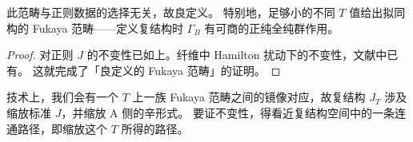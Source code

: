 
\begin{corollary}\label{c8:cor-well-defined}
此范畴与正则数据的选择无关，故良定义。
特别地，足够小的不同 $T$ 值给出拟同构的 Fukaya 范畴——定义复结构时 $\Gamma_B$ 有可商的正纯全纯群作用。
\end{corollary}

\begin{proof}
对正则 $J$ 的不变性已如上。纤维中 Hamilton 扰动下的不变性，文献中已有。
这就完成了「良定义的 Fukaya 范畴」的证明。
\end{proof}

\begin{remark}\label{c8:rem-family}
技术上，我们会有一个 $T$ 上一族 Fukaya 范畴之间的镜像对应，故复结构 $J_T$ 涉及缩放标准 $J$，并缩放 A 侧的辛形式。
要证不变性，得看近复结构空间中的一条连通路径，即缩放这个 $T$ 所得的路径。
\end{remark}


